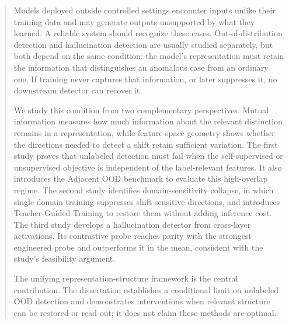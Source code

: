 \begin{abstract}
\linespread{1.12}\selectfont
Models deployed outside controlled settings encounter inputs unlike their training
data and may generate outputs unsupported by what they learned. A reliable system
should recognize these cases. Out-of-distribution detection and hallucination
detection are usually studied separately, but both depend on the same condition:
the model's representation must retain the information that distinguishes an
anomalous case from an ordinary one. If training never captures that information,
or later suppresses it, no downstream detector can recover it.

We study this condition from two complementary perspectives. Mutual information
measures how much information about the relevant distinction remains in a
representation, while feature-space geometry shows whether the directions needed to
detect a shift retain sufficient variation. The first study proves that unlabeled
detection must fail when the self-supervised or unsupervised objective is independent
of the label-relevant features. It also introduces the Adjacent OOD benchmark to
evaluate this high-overlap regime. The second study identifies domain-sensitivity
collapse, in which single-domain training suppresses shift-sensitive directions, and
introduces Teacher-Guided Training to restore them without adding inference cost. The
third study develops a hallucination detector from cross-layer activations. Its
contrastive probe reaches parity with the strongest engineered probe and outperforms
it in the mean, consistent with the study's feasibility argument.

The unifying representation-structure framework is the central contribution. The
dissertation establishes a conditional limit on unlabeled OOD detection and
demonstrates interventions when relevant structure can be restored or read out; it
does not claim these methods are optimal.
\end{abstract}
